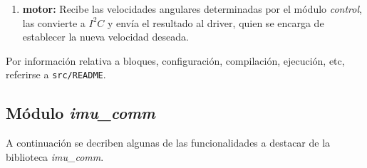 \documentclass[main]{subfiles}
\begin{document}
\begin{enumerate}
\item \textbf{motor:} Recibe las velocidades angulares determinadas por el m\'odulo \textit{control}, las convierte a $I^2C$ y env\'ia el resultado al driver, quien se encarga de establecer la nueva velocidad deseada.

\end{enumerate}

Por información relativa a bloques, configuración, compilación, ejecución, etc, referirse a \verb+src/README+.

\subsection{M\'odulo \textit{imu\_comm}}
\label{sec:software:imu-comm}

A continuaci\'on se decriben algunas de las funcionalidades a destacar de la biblioteca \textit{imu\_comm}.
\end{document}
